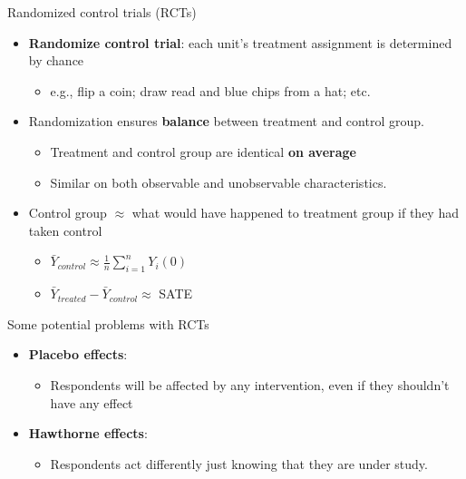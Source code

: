\documentclass[
  ignorenonframetext,
]{beamer}
\providecommand{\tightlist}{%
  \setlength{\itemsep}{0pt}\setlength{\parskip}{0pt}}
\begin{document}
\begin{frame}{Randomized control trials (RCTs)}
\label{randomized-control-trials-rcts}
\begin{itemize}
\tightlist
\item
  \textbf{Randomize control trial}: each unit's treatment assignment is
  determined by chance \pause

  \begin{itemize}
  \tightlist
  \item
    e.g., flip a coin; draw read and blue chips from a hat; etc. \pause
  \end{itemize}
\item
  Randomization ensures \textbf{balance} between treatment and control
  group. \pause

  \begin{itemize}
  \tightlist
  \item
    Treatment and control group are identical \textbf{on average} \pause
  \item
    Similar on both observable and unobservable characteristics. \pause
  \end{itemize}
\item
  Control group \(\approx\) what would have happened to treatment group
  if they had taken control \pause

  \begin{itemize}
  \tightlist
  \item
    \(\bar{Y}_{control} \approx \frac{1}{n} \sum_{i=1}^n Y_i(0)\) \pause
  \item
    \(\bar{Y}_{treated} - \bar{Y}_{control} \approx\) SATE
  \end{itemize}
\end{itemize}
\end{frame}

\begin{frame}{Some potential problems with RCTs}
\label{some-potential-problems-with-rcts}
\begin{itemize}
\tightlist
\item
  \textbf{Placebo effects}: \pause

  \begin{itemize}
  \tightlist
  \item
    Respondents will be affected by any intervention, even if they
    shouldn't have any effect \pause
  \end{itemize}
\item
  \textbf{Hawthorne effects}: \pause

  \begin{itemize}
  \tightlist
  \item
    Respondents act differently just knowing that they are under study.
  \end{itemize}
\end{itemize}
\end{frame}
\end{document}
